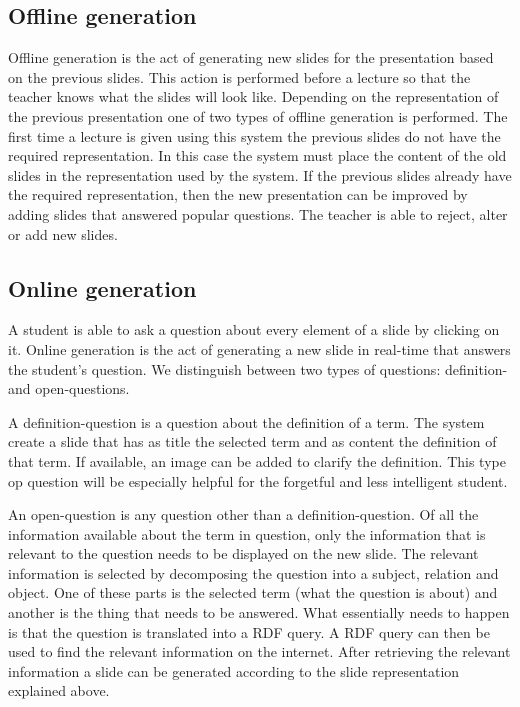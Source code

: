\documentclass[11pt]{article}
\begin{document}
\subsection{Offline generation}
Offline generation is the act of generating new slides for the presentation based on the previous slides. This action is performed before a lecture so that the teacher knows what the slides will look like. Depending on the representation of the previous presentation one of two types of offline generation is performed. The first time a lecture is given using this system the previous slides do not have the required representation. In this case the system must place the content of the old slides in the representation used by the system. If the previous slides already have the required representation, then the new presentation can be improved by adding slides that answered popular questions. The teacher is able to reject, alter or add new slides.

\subsection{Online generation}
A student is able to ask a question about every element of a slide by clicking on it. Online generation is the act of generating a new slide in real-time that answers the student's question. We distinguish between two types of questions: definition- and open-questions. 

A definition-question is a question about the definition of a term. The system create a slide that has as title the selected term and as content the definition of that term. If available, an image can be added to clarify the definition. This type op question will be especially helpful for the forgetful and less intelligent student. 

An open-question is any question other than a definition-question. Of all the information available about the term in question, only the information that is relevant to the question needs to be displayed on the new slide. The relevant information is selected by decomposing the question into a subject, relation and object. One of these parts is the selected term (what the question is about) and another is the thing that needs to be answered. What essentially needs to happen is that the question is translated into a RDF query. A RDF query can then be used to find the relevant information on the internet. After retrieving the relevant information a slide can be generated according to the slide representation explained above.
\end{document}
